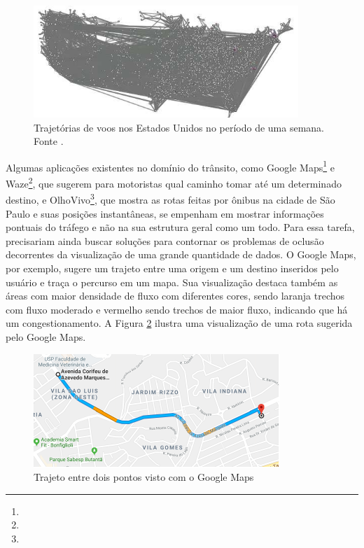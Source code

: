 \begin{figure}[!htb]
  \centering
  \includegraphics[width=100mm]{../figuras/cluttered-map.png}
  \caption[Trajetórias de voos nos Estados Unidos]{Trajetórias de voos nos Estados Unidos no período de uma semana. Fonte \citet{Zhou2013}.}
  \label{fig:exemplo-oclusao}
\end{figure}

  Algumas aplicações existentes no domínio do trânsito, como Google
Maps\footnote{} e
Waze\footnote{}, que sugerem para motoristas qual
caminho tomar até um determinado destino, e
OlhoVivo\footnote{}, que  mostra as rotas feitas
por ônibus na cidade de São Paulo e suas posições instantâneas, se empenham em
mostrar informações pontuais do tráfego e não na sua estrutura geral como um
todo. Para essa tarefa, precisariam ainda buscar soluções para contornar os
problemas de oclusão decorrentes da visualização de uma grande quantidade de
dados. O Google Maps, por exemplo, sugere um trajeto entre uma origem e um
destino inseridos pelo usuário e traça o percurso em um mapa. Sua visualização
destaca também as áreas com maior densidade de fluxo com diferentes cores,
sendo laranja trechos com fluxo moderado e vermelho sendo trechos de maior
fluxo, indicando que há um congestionamento. A Figura \ref{fig:gmaps} ilustra
uma visualização de uma rota sugerida pelo Google Maps.

\begin{figure}[!htb]
  \centering
  \includegraphics[width=\textwidth]{../figuras/maps.pdf}
  \caption{Trajeto entre dois pontos visto com o Google Maps \label{fig:gmaps}}
\end{figure}

